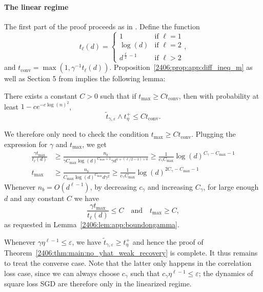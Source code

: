 \paragraph{The linear regime} The first part of the proof proceeds as in \cite{arous2021online}. Define the function
\begin{equation}
    t_\ell(d) = \begin{cases}
        1 &\text{if } \ell = 1 \\
        \log(d)  &\text{if } \ell = 2 \\
        d^{\frac{\ell}2-1}  &\text{if } \ell > 2
    \end{cases}, 
\end{equation}
and $t_{\mathrm{conv}} = \max(1, \gamma^{-1}t_\ell(d))$.
Proposition~\ref{2406:prop:app:diff_ineq_m} as well as Section 5 from \cite{arous2021online} implies the following lemma:
\begin{lemma} \label{2406:lem:app:boundongamma}
    There exists a constant $C > 0$ such that if $t_{\max} \geq C t_{\mathrm{conv}}$, then with probability at least $1 - ce^{-c\log(n)^2}$,
    \begin{equation}
        \tilde t_{\gamma, \varepsilon} \wedge t_\eta^+ \leq Ct_{\mathrm{conv}}.
    \end{equation}
\end{lemma}
We therefore only need to check the condition $t_{\max} \geq C t_{\mathrm{conv}}$.
Plugging the expression for $\gamma$ and $t_{\max}$, we get
\begin{align*}
    \frac{\gamma t_{\max}}{t_\ell(d)} &\geq \frac{n_b}{\gamma C_{\max} \log(d)^{C_{\max}+1} \gamma d^{1 + (\ell/2 - 1)\vee 0}} \geq \frac1{c_\gamma C_{\max}} \log(d)^{C_\gamma - C_{\max} - 1} \\
     t_{\max} &\geq \frac{n_b}{C_{\max}\log(d)^{C_{\max}} d \gamma^2} \geq \frac1{c_\gamma C_{\max}} \log(d)^{2C_\gamma - C_{\max} - 1}
\end{align*} 
Whenever $n_b = O(d^{\ell-1})$, by decreasing $c_\gamma$ and increasing $C_\gamma$, for large enough $d$ and any constant $C$ we have
\[\frac{\gamma t_{\max}}{t_\ell(d)} \leq C \quad \text{and} \quad t_{\max} \geq C, \]
as requested in Lemma~\ref{2406:lem:app:boundongamma}.

Whenever $\gamma \eta^{\ell-1} \leq \varepsilon$, we have $\tilde t_{\gamma, \varepsilon} \geq t_\eta^+$ and hence the proof of Theorem~\ref{2406:thm:main:no_yhat_weak_recovery} is complete. It thus remains to treat the converse case. Note that the latter only happens in the correlation loss case, since we can always choose $c_\gamma$ such that $c_\gamma \eta^{\ell-1} \leq \varepsilon$; the dynamics of square loss SGD are therefore only in the linearized regime.

